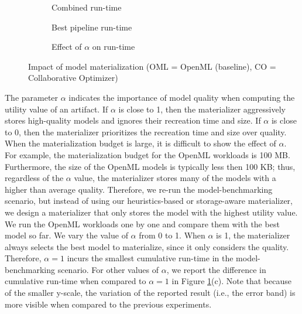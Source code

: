 \begin{figure}[h]
\begin{subfigure}[b]{0.5\linewidth}
\centering
 \resizebox{\columnwidth}{!}{%
%
}
\caption{Combined run-time}
\end{subfigure}%
\begin{subfigure}[b]{0.5\linewidth}
\centering
 \resizebox{\columnwidth}{!}{%
%
}
\caption{Best pipeline run-time}
\end{subfigure}
\begin{subfigure}[b]{\linewidth}
\centering
 \resizebox{\columnwidth}{!}{%
%
}
\caption{Effect of $\alpha$ on run-time}
\end{subfigure}
\caption{Impact of model materialization (OML = OpenML (baseline), CO = Collaborative Optimizer)}
\label{exp-model-materialization}
\end{figure}
The parameter $\alpha$ indicates the importance of model quality when computing the utility value of an artifact.
If $\alpha$ is close to 1, then the materializer aggressively stores high-quality models and ignores their recreation time and size.
If $\alpha$ is close to 0, then the materializer prioritizes the recreation time and size over quality.
When the materialization budget is large, it is difficult to show the effect of $\alpha$.
For example, the materialization budget for the OpenML workloads is 100 MB.
Furthermore, the size of the OpenML models is typically less then 100 KB; thus, regardless of the $\alpha$ value, the materializer stores many of the models with a higher than average quality.
Therefore, we re-run the model-benchmarking scenario, but instead of using our heuristics-based or storage-aware materializer, we design a materializer that only stores the model with the highest utility value.
We run the OpenML workloads one by one and compare them with the best model so far.
We vary the value of $\alpha$ from 0 to 1.
When $\alpha$ is 1, the materializer always selects the best model to materialize, since it only considers the quality.
Therefore, $\alpha=1$ incurs the smallest cumulative run-time in the model-benchmarking scenario.
For other values of $\alpha$, we report the difference in cumulative run-time when compared to $\alpha=1$ in Figure \ref{exp-model-materialization}(c).
Note that because of the smaller y-scale, the variation of the reported result (i.e., the error band) is more visible when compared to the previous experiments.
